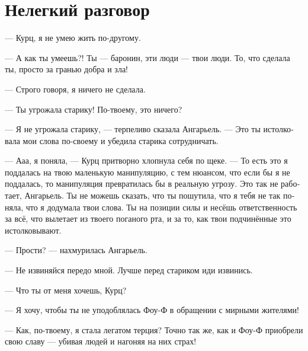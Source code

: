 \documentclass[a4paper,12pt,fleqn]{book}\usepackage{polyglossia}\setdefaultlanguage[babelshorthands=true]{russian}\setotherlanguage{english}\defaultfontfeatures{Ligatures=TeX,Mapping=tex-text}\usepackage{xcolor}\newcommand{\ml}[3]{#2}
\begin{document}
\section{Нелегкий разговор}

--- Курц, я не умею жить по-другому.

--- А как ты умеешь?!
Ты --- баронин, эти люди --- твои люди.
То, что сделала ты, просто за гранью добра и зла!

--- Строго говоря, я ничего не сделала.

--- Ты угрожала старику!
По-твоему, это ничего?

--- Я не угрожала старику, --- терпеливо сказала Ангарьель.
--- Это ты истолковала мои слова по-своему и убедила старика сотрудничать.

--- Ааа, я поняла, --- Курц притворно хлопнула себя по щеке.
\ml{$0$}
{--- То есть это я поддалась на твою маленькую манипуляцию, с тем нюансом, что если бы я не поддалась, то манипуляция превратилась бы в реальную угрозу.}
{``You mean it's me who succumbed to your tiny manipulation, despite of the fact the manipulation becomes a real threat if I wouldn't.}
\ml{$0$}
{Это так не работает, Ангарьель.}
{It's no go, Angariel.}
\ml{$0$}
{Ты не можешь сказать, что ты пошутила, что я тебя не так поняла, что я додумала твои слова.}
{You can't say you joked, or I misunderstood you, or I filled in the blanks.}
\ml{$0$}
{Ты на позиции силы и несёшь ответственность за всё, что вылетает из твоего поганого рта, и за то, как твои подчинённые это истолковывают.}
{You are in a position of power, you are responsible for everything that flies out of your filthy mouth, and for how your subjects interpret that.''}

\ml{$0$}
{--- Прости? --- нахмурилась Ангарьель.}
{``Excuse me?'' Angariel frowned.}

\ml{$0$}
{--- Не извиняйся передо мной.}
{``There's no need for that.}
\ml{$0$}
{Лучше перед стариком иди извинись.}
{Make your excuses to the old man.''}

\ml{$0$}
{--- Что ты от меня хочешь, Курц?}
{``What do you want from me, Kurz?''}

\ml{$0$}
{--- Я хочу, чтобы ты не уподоблялась Фоу-Ф в обращении с мирными жителями!}
{``I want you not to treat civilians like bloody Foe-F!''}

\ml{$0$}
{--- Как, по-твоему, я стала легатом терция?}
{``How do you think I rose to the rank of legate tercia?}
\ml{$0$}
{Точно так же, как и Фоу-Ф приобрели свою славу --- убивая людей и нагоняя на них страх!}
{The same way Foe-F gained their reputation---I killed and intimidated humans!''}
\end{document}
